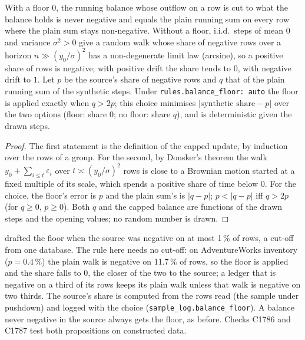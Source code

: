 \setcounter{proposition}{1786}
\begin{proposition}\label{prop:stockfloor}
With a floor $0$, the running balance whose outflow on a row is cut to what the balance holds is never negative and equals the plain running sum on every row where the plain sum stays non-negative. Without a floor, i.i.d.\ steps of mean $0$ and variance $\sigma^2>0$ give a random walk whose share of negative rows over a horizon $n\gg(y_0/\sigma)^2$ has a non-degenerate limit law (arcsine), so a positive share of rows is negative; with positive drift the share tends to $0$, with negative drift to $1$. Let $p$ be the source's share of negative rows and $q$ that of the plain running sum of the synthetic steps. Under \texttt{rules.balance\_floor: auto} the floor is applied exactly when $q>2p$; this choice minimises $|\text{synthetic share}-p|$ over the two options (floor: share $0$; no floor: share $q$), and is deterministic given the drawn steps.
\end{proposition}
\begin{proof}
The first statement is the definition of the capped update, by induction over the rows of a group. For the second, by Donsker's theorem the walk $y_0+\sum_{i\le t}\varepsilon_i$ over $t\asymp (y_0/\sigma)^2$ rows is close to a Brownian motion started at a fixed multiple of its scale, which spends a positive share of time below 0. For the choice, the floor's error is $p$ and the plain sum's is $|q-p|$; $p<|q-p|$ iff $q>2p$ (for $q\ge0$, $p\ge0$). Both $q$ and the capped balance are functions of the drawn steps and the opening values; no random number is drawn.
\end{proof}
 drafted the floor when the source was negative on at most 1\,\% of rows, a cut-off from one database. The rule here needs no cut-off: on AdventureWorks inventory ($p=0.4\,\%$) the plain walk is negative on 11.7\,\% of rows, so the floor is applied and the share falls to 0, the closer of the two to the source; a ledger that is negative on a third of its rows keeps its plain walk unless that walk is negative on two thirds. The source's share is computed from the rows read (the sample under pushdown) and logged with the choice (\texttt{sample\_log.balance\_floor}). A balance never negative in the source always gets the floor, as before. Checks C1786 and C1787 test both propositions on constructed data.

